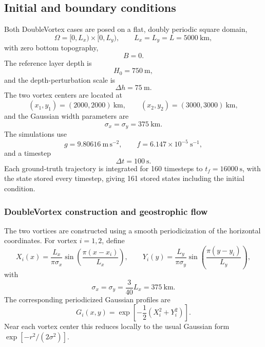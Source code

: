 \documentclass[12pt]{article}
\begin{document}
\subsection{Initial and boundary conditions}

Both DoubleVortex cases are posed on a flat, doubly periodic square domain,
\begin{equation}
	\Omega=[0,L_x)\times[0,L_y),
	\qquad
	L_x=L_y=L=5000~\mathrm{km},
\end{equation}
with zero bottom topography,
\begin{equation}
	B=0.
\end{equation}
The reference layer depth is
\begin{equation}
	H_0=750~\mathrm{m},
\end{equation}
and the depth-perturbation scale is
\begin{equation}
	\Delta h=75~\mathrm{m}.
\end{equation}
The two vortex centers are located at
\begin{equation}
	(x_1,y_1)=(2000,2000)~\mathrm{km},
	\qquad
	(x_2,y_2)=(3000,3000)~\mathrm{km},
\end{equation}
and the Gaussian width parameters are
\begin{equation}
	\sigma_x=\sigma_y=375~\mathrm{km}.
\end{equation}
The simulations use
\begin{equation}
	g=9.80616~\mathrm{m\,s^{-2}},
	\qquad
	f=6.147\times10^{-5}~\mathrm{s^{-1}},
\end{equation}
and a timestep
\begin{equation}
	\Delta t=100~\mathrm{s}.
\end{equation}
Each ground-truth trajectory is integrated for 160 timesteps to
$t_f=16000~\mathrm{s}$, with the state stored every timestep, giving 161
stored states including the initial condition.


\subsubsection{DoubleVortex construction and geostrophic flow}

The two vortices are constructed using a smooth periodicization of the
horizontal coordinates. For vortex $i=1,2$, define
\begin{equation}
	X_i(x)
	=
	\frac{L_x}{\pi\sigma_x}
	\sin\!\left(
	\frac{\pi(x-x_i)}{L_x}
	\right),
	\qquad
	Y_i(y)
	=
	\frac{L_y}{\pi\sigma_y}
	\sin\!\left(
	\frac{\pi(y-y_i)}{L_y}
	\right),
\end{equation}
with
\begin{equation}
	\sigma_x=\sigma_y=\frac{3}{40}L_x=375~\mathrm{km}.
\end{equation}
The corresponding periodicized Gaussian profiles are
\begin{equation}
	G_i(x,y)
	=
	\exp\!\left[
	-\frac{1}{2}
	\left(
	X_i^2+Y_i^2
	\right)
	\right].
	\label{eq:doublevortex_gaussians}
\end{equation}
Near each vortex center this reduces locally to the usual Gaussian form
$\exp[-r^2/(2\sigma^2)]$.
\end{document}
